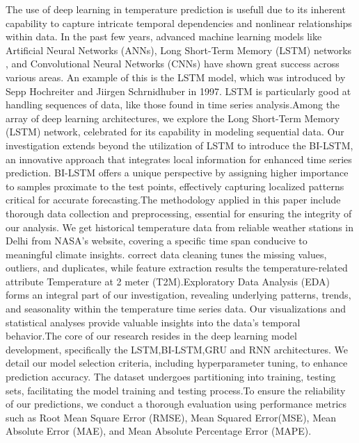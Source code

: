 \documentclass[sn-mathphys,Numbered]{sn-jnl}
\theoremstyle{thmstyleone}
\theoremstyle{thmstyletwo}
\theoremstyle{thmstylethree}
\begin{document}
The use of deep learning in temperature prediction is usefull due to its inherent capability to capture intricate temporal dependencies and nonlinear relationships within data. In the past few years, advanced machine learning models like Artificial Neural Networks (ANNs), Long Short-Term Memory (LSTM) networks\cite{wang2017predrnn} \cite{chen2021study}, and Convolutional Neural Networks (CNNs)\cite{chen2021correction} have shown great success across various areas. An example of this is the LSTM model, which was introduced by Sepp Hochreiter and Jiirgen Schrnidhuber\cite{graves2012long} in 1997. LSTM is particularly good at handling sequences of data, like those found in time series analysis.Among the array of deep learning architectures, we explore the Long Short-Term Memory (LSTM) network, celebrated for its capability in modeling sequential data. Our investigation extends beyond the utilization of LSTM to introduce the BI-LSTM, an innovative approach that integrates local information for enhanced time series prediction. BI-LSTM offers a unique perspective by assigning higher importance to samples proximate to the test points, effectively capturing localized patterns critical for accurate forecasting.The methodology applied in this paper include thorough data collection and preprocessing, essential for ensuring the integrity of our analysis. We get historical temperature data from reliable weather stations in Delhi from NASA's website, covering a specific time span conducive to meaningful climate insights. correct data cleaning tunes the missing values, outliers, and duplicates, while feature extraction results the temperature-related attribute Temperature at 2 meter (T2M).Exploratory Data Analysis (EDA) forms an integral part of our investigation, revealing underlying patterns, trends, and seasonality within the temperature time series data. Our visualizations and statistical analyses provide valuable insights into the data's temporal behavior.The core of our research resides in the deep learning model development, specifically the LSTM,BI-LSTM,GRU and RNN architectures. We detail our model selection criteria, including hyperparameter tuning, to enhance prediction accuracy. The dataset undergoes partitioning into training, testing sets, facilitating the model training and testing process.To ensure the reliability of our predictions, we conduct a thorough evaluation using performance metrics such as Root Mean Square Error (RMSE), Mean Squared Error(MSE), Mean Absolute Error (MAE), and Mean Absolute Percentage Error (MAPE).
\end{document}
